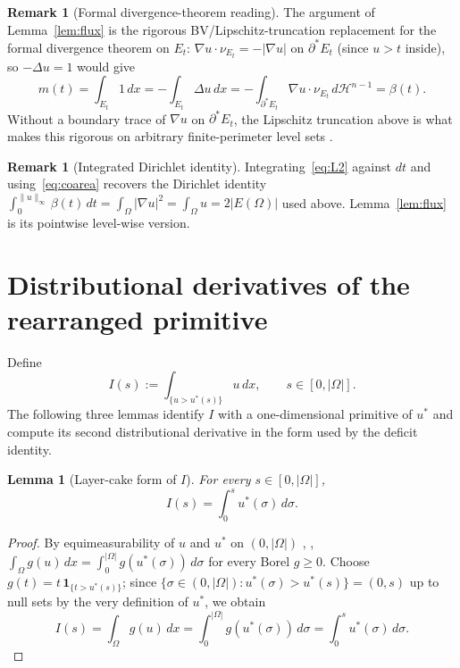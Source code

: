 \documentclass[11pt]{article}
\newtheorem{lemma}[theorem]{Lemma}
\theoremstyle{definition}
\newtheorem{remark}[theorem]{Remark}
\newcommand{\Om}{\Omega}
\begin{document}
\begin{remark}[Formal divergence-theorem reading]\label{rem:divergence}
The argument of Lemma~\ref{lem:flux} is the rigorous BV/Lipschitz-truncation
replacement for the formal divergence theorem on $E_{t}$:
$\nabla u\cdot\nu_{E_{t}}=-|\nabla u|$ on $\partial^{*}E_{t}$ (since
$u>t$ inside), so $-\Delta u=1$ would give
\[
   m(t)=\int_{E_{t}}1\,dx=-\int_{E_{t}}\Delta u\,dx
   =-\int_{\partial^{*}E_{t}}\nabla u\cdot\nu_{E_{t}}\,d\mathcal H^{n-1}
   =\beta(t).
\]
Without a boundary trace of $\nabla u$ on $\partial^{*}E_{t}$, the
Lipschitz truncation above is what makes this rigorous on arbitrary
finite-perimeter level sets \cite[Ch.~17]{Maggi2012}.
\end{remark}

\begin{remark}[Integrated Dirichlet identity]
Integrating~\eqref{eq:L2} against $dt$ and using~\eqref{eq:coarea}
recovers the Dirichlet identity
$\int_{0}^{\|u\|_{\infty}}\beta(t)\,dt=\int_{\Om}|\nabla u|^{2}
=\int_{\Om}u=2|E(\Om)|$ used above. Lemma~\ref{lem:flux} is its
pointwise level-wise version.
\end{remark}

\section{Distributional derivatives of the rearranged primitive}
\label{sec:Iprimitive}

Define
\begin{equation}\label{eq:Idef}
   I(s):=\int_{\{u>u^{*}(s)\}}u\,dx,\qquad s\in[0,|\Om|].
\end{equation}
The following three lemmas identify $I$ with a one-dimensional primitive
of $u^{*}$ and compute its second distributional derivative in the form
used by the deficit identity.

\begin{lemma}[Layer-cake form of $I$]\label{lem:I3a}
For every $s\in[0,|\Om|]$,
\begin{equation}\label{eq:L3a}
   I(s)=\int_{0}^{s}u^{*}(\sigma)\,d\sigma.
\end{equation}
\end{lemma}

\begin{proof}
By equimeasurability of $u$ and $u^{*}$ on $(0,|\Om|)$
\cite[\S 2]{Kawohl1985}, \cite{Talenti1976},
$\int_{\Om}g(u)\,dx=\int_{0}^{|\Om|}g(u^{*}(\sigma))\,d\sigma$ for every
Borel $g\ge 0$. Choose $g(t)=t\,\mathbf 1_{\{t>u^{*}(s)\}}$; since
$\{\sigma\in(0,|\Om|):u^{*}(\sigma)>u^{*}(s)\}=(0,s)$ up to null sets by
the very definition of $u^{*}$, we obtain
\[
   I(s)=\int_{\Om}g(u)\,dx
       =\int_{0}^{|\Om|}g(u^{*}(\sigma))\,d\sigma
       =\int_{0}^{s}u^{*}(\sigma)\,d\sigma.
\]
\end{proof}
\end{document}
